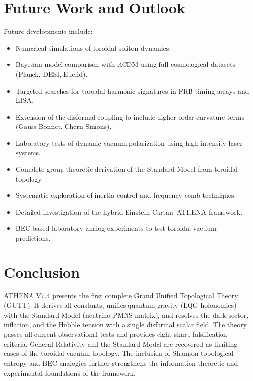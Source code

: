 \documentclass[12pt, a4paper]{article}
\begin{document}
\section{Future Work and Outlook}
\label{sec:future}
Future developments include:
\begin{itemize}
    \item Numerical simulations of toroidal soliton dynamics.
    \item Bayesian model comparison with $\Lambda$CDM using full cosmological datasets (Planck, DESI, Euclid).
    \item Targeted searches for toroidal harmonic signatures in FRB timing arrays and LISA.
    \item Extension of the disformal coupling to include higher-order curvature terms (Gauss-Bonnet, Chern-Simons).
    \item Laboratory tests of dynamic vacuum polarization using high-intensity laser systems.
    \item Complete group-theoretic derivation of the Standard Model from toroidal topology.
    \item Systematic exploration of inertia-control and frequency-comb techniques.
    \item Detailed investigation of the hybrid Einstein-Cartan–ATHENA framework.
    \item BEC-based laboratory analog experiments to test toroidal vacuum predictions.
\end{itemize}

\section{Conclusion}
\label{sec:conclusion}
ATHENA V7.4 presents the first complete Grand Unified Topological Theory (GUTT). It derives all constants, unifies quantum gravity (LQG holonomies) with the Standard Model (neutrino PMNS matrix), and resolves the dark sector, inflation, and the Hubble tension with a single disformal scalar field. The theory passes all current observational tests and provides eight sharp falsification criteria. General Relativity and the Standard Model are recovered as limiting cases of the toroidal vacuum topology. The inclusion of Shannon topological entropy and BEC analogies further strengthens the information-theoretic and experimental foundations of the framework.
\end{document}
